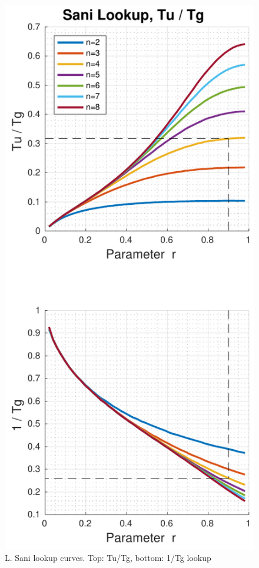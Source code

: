 \clearpage

\begin{figure}[t]
    \includegraphics[width=\linewidth]{images/sani_curves_tu_tg}
    \caption{L. Sani lookup curves. Top: Tu/Tg, bottom: 1/Tg lookup}
    \label{fig:sani_tu_tg}
\end{figure}
